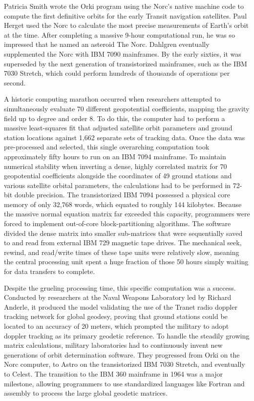 Patricia Smith wrote the Orki program using the Norc’s native machine code to compute the first definitive orbits for the early Transit navigation satellites. Paul Herget used the Norc to calculate the most precise measurements of Earth's orbit at the time. After completing a massive 9-hour computational run, he was so impressed that he named an asteroid The Norc. Dahlgren eventually supplemented the Norc with IBM 7090 mainframes. By the early sixties, it was superseded by the next generation of transistorized mainframes, such as the IBM 7030 Stretch, which could perform hundreds of thousands of operations per second.

A historic computing marathon occurred when researchers attempted to simultaneously evaluate 70 different geopotential coefficients, mapping the gravity field up to degree and order 8. To do this, the computer had to perform a massive least-squares fit that adjusted satellite orbit parameters and ground station locations against 1,662 separate sets of tracking data. Once the data was pre-processed and selected, this single overarching computation took approximately fifty hours to run on an IBM 7094 mainframe. To maintain numerical stability when inverting a dense, highly correlated matrix for 70 geopotential coefficients alongside the coordinates of 49 ground stations and various satellite orbital parameters, the calculations had to be performed in 72-bit double precision. The transistorized IBM 7094 possessed a physical core memory of only 32,768 words, which equated to roughly 144 kilobytes. Because the massive normal equation matrix far exceeded this capacity, programmers were forced to implement out-of-core block-partitioning algorithms. The software divided the dense matrix into smaller sub-matrices that were sequentially saved to and read from external IBM 729 magnetic tape drives. The mechanical seek, rewind, and read/write times of these tape units were relatively slow, meaning the central processing unit spent a huge fraction of those 50 hours simply waiting for data transfers to complete. 

Despite the grueling processing time, this specific computation was a success. Conducted by researchers at the Naval Weapons Laboratory led by Richard Anderle, it produced the model validating the use of the Tranet radio doppler tracking network for global geodesy, proving that ground stations could be located to an accuracy of 20 meters, which prompted the military to adopt doppler tracking as its primary geodetic reference. To handle the steadily growing matrix calculations, military laboratories had to continuously invent new generations of orbit determination software. They progressed from Orki on the Norc computer, to Astro on the transistorized IBM 7030 Stretch, and eventually to Celest. The transition to the IBM 360 mainframe in 1964 was a major milestone, allowing programmers to use standardized languages like Fortran and assembly to process the large global geodetic matrices.

